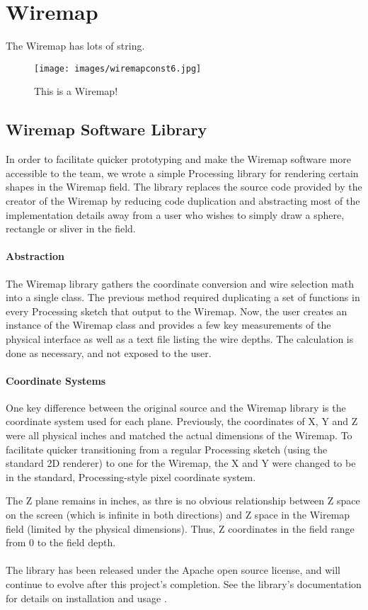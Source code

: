 \section{Wiremap}
The Wiremap has lots of string.
\begin{figure}[htp]\centering
  \texttt{[image: images/wiremapconst6.jpg]}
  \caption{This is a Wiremap!}\label{fig:wmdiagram}
\end{figure}
\subsection{Wiremap Software Library}
In order to facilitate quicker prototyping and make the Wiremap software more accessible to the team, we wrote a simple Processing library for rendering certain shapes in the Wiremap field. The library replaces the source code provided by the creator of the Wiremap \cite{AH} by reducing code duplication and abstracting most of the implementation details away from a user who wishes to simply draw a sphere, rectangle or sliver in the field.

\paragraph{Abstraction}
The Wiremap library gathers the coordinate conversion and wire selection math into a single class. The previous method required duplicating a set of functions in every Processing sketch that output to the Wiremap. Now, the user creates an instance of the Wiremap class and provides a few key measurements of the physical interface as well as a text file listing the wire depths. The calculation is done as necessary, and not exposed to the user.

\paragraph{Coordinate Systems}
One key difference between the original source and the Wiremap library is the coordinate system used for each plane. Previously, the coordinates of X, Y and Z were all physical inches and matched the actual dimensions of the Wiremap. To facilitate quicker transitioning from a regular Processing sketch (using the standard 2D renderer) to one for the Wiremap, the X and Y were changed to be in the standard, Processing-style pixel coordinate system.

The Z plane remains in inches, as thre is no obvious relationship between Z space on the screen (which is infinite in both directions) and Z space in the Wiremap field (limited by the physical dimensions). Thus, Z coordinates in the field range from 0 to the field depth.

\paragraph{}The library has been released under the Apache open source license, and will continue to evolve after this project's completion. See the library's documentation for details on installation and usage \cite{CP}.
